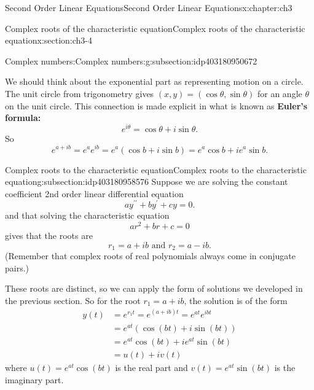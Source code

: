 \documentclass[oneside,10pt,]{book}
\newcommand{\terminology}[1]{\textbf{#1}}
\numberwithin{equation}{section}
\numberwithin{equation}{section}
\newcommand{\amp}{&}
\begin{document}
\begin{chapterptx}{Second Order Linear Equations}{}{Second Order Linear Equations}{}{}{x:chapter:ch3}
\begin{sectionptx}{Complex roots of the characteristic equation}{}{Complex roots of the characteristic equation}{}{}{x:section:ch3-4}
\begin{subsectionptx}{Complex numbers:}{}{Complex numbers:}{}{}{g:subsection:idp403180950672}
\par
We should think about the exponential part as representing motion on a circle. The unit circle from trigonometry gives \((x,y) = (\cos \theta, \sin \theta)\) for an angle \(\theta\) on the unit circle. This connection is made explicit in what is known as \terminology{Euler's formula:}%
\begin{equation*}
e^{i\theta}=\cos \theta+i\sin \theta.
\end{equation*}
So%
\begin{equation*}
e^{a+ib}=e^{a}e^{ib}=e^{a}\left(\cos b+i\sin b\right)=e^{a}\cos b+ie^{a}\sin b.
\end{equation*}
%
\end{subsectionptx}
%
%
\typeout{************************************************}
\typeout{************************************************}
%
\begin{subsectionptx}{Complex roots to the characteristic equation}{}{Complex roots to the characteristic equation}{}{}{g:subsection:idp403180958576}
Suppose we are solving the constant coefficient 2nd order linear differential equation%
\begin{equation*}
ay^{\prime\prime}+by^{\prime}+cy=0.
\end{equation*}
and that solving the characteristic equation%
\begin{equation*}
ar^{2}+br+c=0
\end{equation*}
gives that the roots are%
\begin{equation*}
r_1=a + ib \text{ and }r_2=a - ib.
\end{equation*}
(Remember that complex roots of real polynomials always come in conjugate pairs.)%
\par
These roots are distinct, so we can apply the form of solutions we developed in the previous section. So for the root \(r_1 = a + ib\), the solution is of the form%
\begin{align*}
y(t) \amp =e^{r_1t}=e^{\left(a+ib \right)t}=e^{a t}e^{ib t}\\
\amp =e^{a t}\left(\cos\left(b t\right)+i\sin\left(b t\right)\right)\\
\amp =e^{a t}\cos\left(b t\right)+ie^{a t}\sin\left(b t\right)\\
\amp =u(t)+iv(t)
\end{align*}
where \(u(t)=e^{a t}\cos\left(b t\right)\) is the real part and \(v(t)=e^{a t}\sin\left(b t\right)\) is the imaginary part.%
\par

\end{subsectionptx}
\end{sectionptx}
\end{chapterptx}
\end{document}
